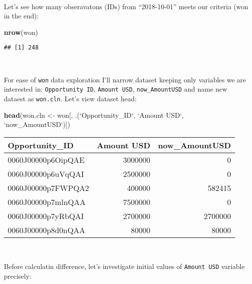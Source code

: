 \documentclass[]{article}
\newenvironment{Shaded}{\begin{snugshade}}{\end{snugshade}}
\newcommand{\DataTypeTok}[1]{\textcolor[rgb]{0.13,0.29,0.53}{#1}}
\newcommand{\KeywordTok}[1]{\textcolor[rgb]{0.13,0.29,0.53}{\textbf{#1}}}
\newcommand{\NormalTok}[1]{#1}
\newcommand{\OperatorTok}[1]{\textcolor[rgb]{0.81,0.36,0.00}{\textbf{#1}}}
\newcommand{\StringTok}[1]{\textcolor[rgb]{0.31,0.60,0.02}{#1}}
\begin{document}
~

Let's see how many obseravatons (IDs) from ``2018-10-01'' meets our
criteria (won in the end):

\begin{Shaded}
\begin{Highlighting}[]
\KeywordTok{nrow}\NormalTok{(won)}
\end{Highlighting}
\end{Shaded}

\begin{verbatim}
## [1] 248
\end{verbatim}

~

For ease of \texttt{won} data exploration I'll narrow dataset keeping
only variables we are interested in: \texttt{Opportunity\ ID},
\texttt{Amount\ USD}, \texttt{now\_AmountUSD} and name new dataest as
\texttt{won.cln}. Let's view dataset head:

\begin{Shaded}
\begin{Highlighting}[]
\KeywordTok{head}\NormalTok{(won.cln <-}\StringTok{ }\NormalTok{won[, .(}\StringTok{`}\DataTypeTok{Opportunity_ID}\StringTok{`}\NormalTok{, }\StringTok{`}\DataTypeTok{Amount USD}\StringTok{`}\NormalTok{, }\StringTok{`}\DataTypeTok{now_AmountUSD}\StringTok{`}\NormalTok{)])}
\end{Highlighting}
\end{Shaded}

\begin{tabular}{l|r|r}
\hline
Opportunity\_ID & Amount USD & now\_AmountUSD\\
\hline
0060J00000p6OipQAE & 3000000 & 0\\
\hline
0060J00000p6uVqQAI & 2500000 & 0\\
\hline
0060J00000p7FWPQA2 & 400000 & 582415\\
\hline
0060J00000p7mlnQAA & 7500000 & 0\\
\hline
0060J00000p7yRbQAI & 2700000 & 2700000\\
\hline
0060J00000p8d0nQAA & 80000 & 80000\\
\hline
\end{tabular}

~

Before calculatin difference, let's investigate initial values of
\texttt{Amount\ USD} variable precisely:

\begin{Shaded}
\end{Shaded}
\end{document}
